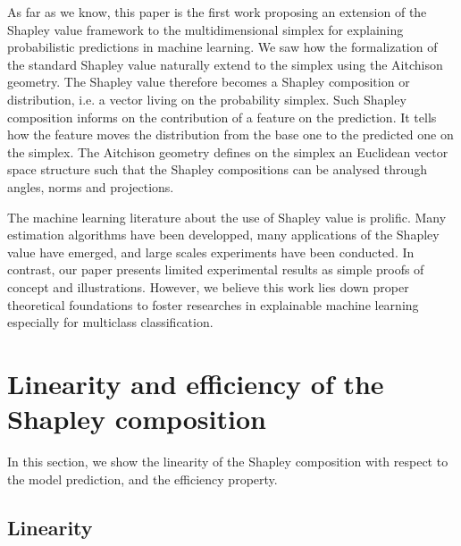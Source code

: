 \documentclass{article}
\theoremstyle{plain}
\theoremstyle{definition}
\theoremstyle{remark}
\begin{document}
As far as we know, this paper is the first work proposing an extension of the Shapley value framework to the multidimensional simplex for explaining probabilistic predictions in machine learning. We saw how the formalization of the standard Shapley value naturally extend to the simplex using the Aitchison geometry. The Shapley value therefore becomes a Shapley composition or distribution, i.e. a vector living on the probability simplex. Such Shapley composition informs on the contribution of a feature on the prediction. It tells how the feature moves the distribution from the base one to the predicted one on the simplex. The Aitchison geometry defines on the simplex an Euclidean vector space structure such that the Shapley compositions can be analysed through angles, norms and projections.

The machine learning literature about the use of Shapley value is prolific. Many estimation algorithms have been developped, many applications of the Shapley value have emerged, and large scales experiments have been conducted. In contrast, our paper presents limited experimental results as simple proofs of concept and illustrations. However, we believe this work lies down proper theoretical foundations to foster researches in explainable machine learning especially for multiclass classification.

\nocite{langley00}





\newpage
\appendix
\onecolumn

\section{Linearity and efficiency of the Shapley composition}
\label{app:properties}
In this section, we show the linearity of the Shapley composition with respect to the model prediction, and the efficiency property.

\subsection{Linearity}
\end{document}
